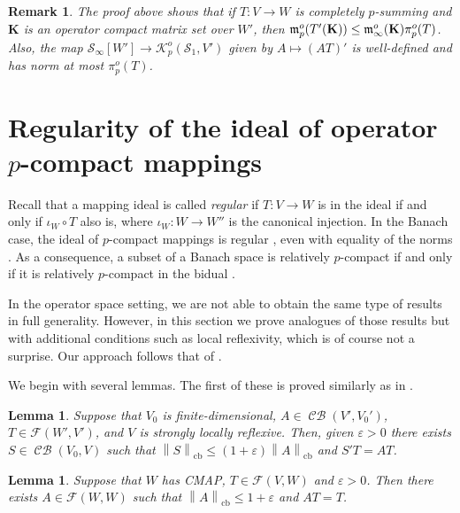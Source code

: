 \documentclass[11pt]{amsart}
\DeclareMathOperator{\cb}{cb}
\DeclareMathOperator{\CB}{\mathcal{CB}}
\newcommand{\n}[1]{ \left\|#1\right\| }
\newtheorem{lemma}[theorem]{Lemma}
\newtheorem{remark}[theorem]{Remark}
\numberwithin{equation}{section}
\begin{document}
\begin{remark}
The proof above shows that if $T : V \to W$ is completely $p$-summing and $\mathbf{K}$ is an operator compact matrix set over $W'$, then $\frak m_p^o(T'(\mathbf{K})) \le \frak m_\infty^o(\mathbf{K}) \pi_p^o(T)$.
Also, the map $\mathcal{S}_\infty[W'] \to \mathcal{K}_p^o(\mathcal{S}_1,V')$ given by $A \mapsto (AT)'$ is well-defined and has norm at most $\pi^o_p(T)$.
\end{remark}



\section{Regularity of the ideal of operator $p$-compact mappings}\label{sec-regularity}

Recall that a mapping ideal is called \emph{regular} if $T : V \to W$ is in the ideal if and only if $\iota_W \circ T$ also is, where $\iota_W : W \to W''$ is the canonical injection.
In the Banach case, the ideal of $p$-compact mappings is regular \cite[Cor. 3.6]{Delgado-Pineiro-Serrano-adjoints}, even with equality of the norms \cite[Cor. 2.6]{Galicer-Lassalle-Turco}. As a consequence, a subset of a Banach space is relatively $p$-compact if and only if it is relatively $p$-compact in the bidual \cite[Thm. 2.4]{Galicer-Lassalle-Turco}.

In the operator space setting, we are not able to obtain the same type of results in full generality. However, in this section we prove analogues of those results but with additional conditions such as local reflexivity, which is of course not a surprise.
Our approach follows that of \cite{Pietsch-p-compact}.


We begin with several lemmas. The first of these is proved similarly as in  \cite[Lem. E.3.2]{Pietsch-Operator-Ideals}.

\begin{lemma}\label{lemma-Pietsch-E-3-2}
Suppose that $V_0$ is finite-dimensional, $A \in \CB(V', V_0')$, $T \in \mathcal{F}(W',V')$, and $V$ is strongly locally reflexive. Then, given $\varepsilon>0$ there exists $S \in \CB(V_0,V)$ such that $\n{S}_{\cb} \le (1+\varepsilon)\n{A}_{\cb}$ and $S'T = AT$.   
\end{lemma}


\begin{lemma}\label{lemma-Pietsch-10-2-5}
Suppose that $W$ has CMAP, $T \in \mathcal{F}(V,W)$  and $\varepsilon>0$. Then there exists $A \in\mathcal{F}(W,W)$ such that $\n{A}_{\cb} \le 1+\varepsilon$ and $AT=T$.  
\end{lemma}
\end{document}
